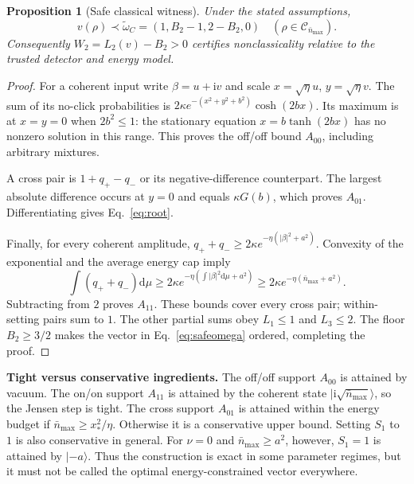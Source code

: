 \documentclass[11pt,a4paper]{article}
\newcommand{\Cset}{\mathcal C}
\newcommand{\nbar}{\bar n_{\max}}
\newcommand{\ket}[1]{\lvert #1\rangle}
\newcommand{\abs}[1]{\lvert #1\rvert}
\newcommand{\dd}{\mathrm d}
\newtheorem{proposition}{Proposition}
\begin{document}
\begin{proposition}[Safe classical witness]\label{prop:safe}
Under the stated assumptions,
\begin{equation}
 v(\rho)\prec\widetilde\omega_C=(1,B_2-1,2-B_2,0)
 \quad (\rho\in\Cset_{\nbar}).\label{eq:safeomega}
\end{equation}
Consequently $W_2=L_2(v)-B_2>0$ certifies nonclassicality relative to the
trusted detector and energy model.
\end{proposition}
\begin{proof}
For a coherent input write $\beta=u+\mathrm iv$ and scale
$x=\sqrt\eta u$, $y=\sqrt\eta v$.
The sum of its no-click probabilities is
$2\kappa e^{-(x^2+y^2+b^2)}\cosh(2bx)$.
Its maximum is at $x=y=0$ when $2b^2\leq1$: the stationary equation
$x=b\tanh(2bx)$ has no nonzero solution in this range. This proves the
off/off bound $A_{00}$, including arbitrary mixtures.

A cross pair is $1+q_+-q_-$ or its negative-difference counterpart.
The largest absolute difference occurs at $y=0$ and equals $\kappa G(b)$,
which proves $A_{01}$. Differentiating gives Eq.~\eqref{eq:root}.

Finally, for every coherent amplitude,
$q_++q_-\geq2\kappa e^{-\eta(\abs\beta^2+a^2)}$.
Convexity of the exponential and the average energy cap imply
\begin{equation}
 \int(q_++q_-)\dd\mu\geq
 2\kappa e^{-\eta(\int\abs\beta^2\dd\mu+a^2)}
 \geq2\kappa e^{-\eta(\nbar+a^2)}.
 \label{eq:jensen}
\end{equation}
Subtracting from $2$ proves $A_{11}$. These bounds cover every cross pair;
within-setting pairs sum to $1$. The other partial sums obey $L_1\leq1$
and $L_3\leq2$. The floor $B_2\geq3/2$ makes the vector in
Eq.~\eqref{eq:safeomega} ordered, completing the proof.
\end{proof}

\textbf{Tight versus conservative ingredients.} The off/off support $A_{00}$
is attained by vacuum. The on/on support $A_{11}$ is attained by the coherent
state $\ket{\mathrm i\sqrt{\nbar}}$, so the Jensen step is tight. The cross
support $A_{01}$ is attained within the energy budget if
$\nbar\geq x_*^2/\eta$. Otherwise it is a conservative upper bound. Setting
$S_1$ to $1$ is also conservative in general. For $\nu=0$ and
$\nbar\geq a^2$, however, $S_1=1$ is attained by $\ket{-a}$.
Thus the construction is exact in some parameter regimes, but it must not be
called the optimal energy-constrained vector everywhere.
\end{document}
